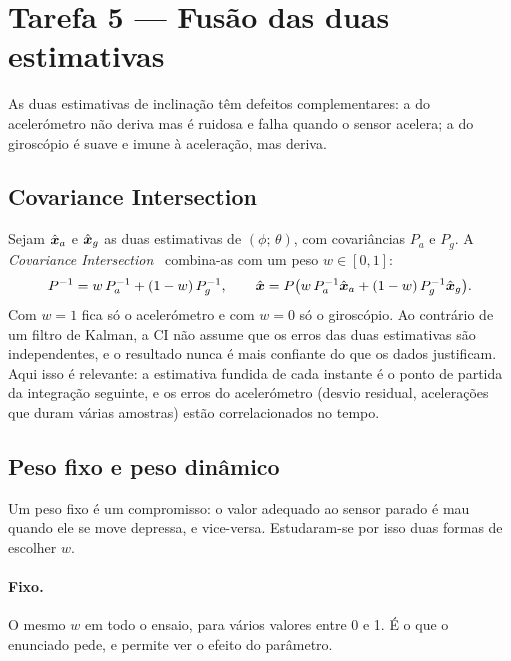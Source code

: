 \section{Tarefa 5 --- Fusão das duas estimativas}
\label{sec:fusao}

As duas estimativas de inclinação têm defeitos complementares: a do
acelerómetro não deriva mas é ruidosa e falha quando o sensor acelera; a do
giroscópio é suave e imune à aceleração, mas deriva.

\subsection{Covariance Intersection}

Sejam $\hat{\boldsymbol{x}}_a$ e $\hat{\boldsymbol{x}}_g$ as duas estimativas de
$(\phi;\,\theta)$, com covariâncias $P_a$ e $P_g$. A
\emph{Covariance Intersection}~\cite{julier1997} combina-as com um peso
$w \in [0,1]$:
\begin{equation}
P^{-1} = w\,P_a^{-1} + (1-w)\,P_g^{-1}, \qquad
\hat{\boldsymbol{x}} = P\bigl(w\,P_a^{-1}\hat{\boldsymbol{x}}_a + (1-w)\,P_g^{-1}\hat{\boldsymbol{x}}_g\bigr).
\label{eq:ci}
\end{equation}
Com $w=1$ fica só o acelerómetro e com $w=0$ só o giroscópio. Ao contrário
de um filtro de Kalman, a CI não assume que os erros das duas estimativas são
independentes, e o resultado nunca é mais confiante do que os dados
justificam. Aqui isso é relevante: a estimativa fundida de cada instante é o
ponto de partida da integração seguinte, e os erros do acelerómetro (desvio
residual, acelerações que duram várias amostras) estão correlacionados no
tempo.

\subsection{Peso fixo e peso dinâmico}

Um peso fixo é um compromisso: o valor adequado ao sensor parado é mau quando
ele se move depressa, e vice-versa. Estudaram-se por isso duas formas de
escolher $w$.

\paragraph{Fixo.} O mesmo $w$ em todo o ensaio, para vários valores entre 0 e
1. É o que o enunciado pede, e permite ver o efeito do parâmetro.


